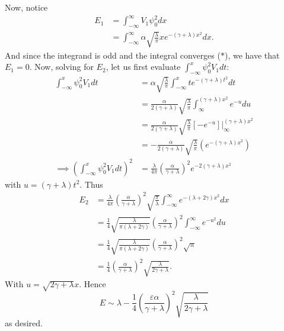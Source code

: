 \documentclass{article}
\begin{document}
\begin{itemize}
\begin{itemize}
        Now, notice 
        \begin{align*}
            E_1 &= \int_{-\infty}^{\infty}V_1\psi_0^2dx\\
            &= \int_{-\infty}^{\infty}\alpha \sqrt{\frac{\lambda}{\pi}}xe^{-(\gamma + \lambda)x^2}dx.
        \end{align*}
        And since the integrand is odd and the integral converges ($\ast$), we have that $E_1 = 0$. Now, solving for $E_2$, let us first evaluate ${\displaystyle \int_{-\infty}^{x}\psi_0^2V_1dt }$:
        \begin{align*}
            \int_{-\infty}^x\psi_0^2V_1dt &= \alpha\sqrt{\frac{\lambda}{\pi}}\int_{-\infty}^{x}te^{-(\gamma + \lambda)t^2}dt\\
            &= \frac{\alpha}{2(\gamma + \lambda)}\sqrt{\frac{\lambda}{\pi}}\int_{\infty}^{(\gamma + \lambda)x^2}e^{-u}du\\
            &= \frac{\alpha}{2(\gamma + \lambda)}\sqrt{\frac{\lambda}{\pi}}[-e^{-u}]\bigg|_{\infty}^{(\gamma + \lambda)x^2}\\
            &= -\frac{\alpha}{2(\gamma + \lambda)}\sqrt{\frac{\lambda}{\pi}}\left(e^{-(\gamma + \lambda)x^2}\right)\\
            \implies \left(\int_{-\infty}^{x}\psi_0^2V_1dt\right)^2 &= \frac{\lambda}{4\pi}\left(\frac{\alpha}{\gamma + \lambda}\right)^2e^{-2(\gamma + \lambda)x^2}
        \end{align*}
        with $u = (\gamma + \lambda)t^2$. Thus
        \begin{align*}
            E_2 &= \frac{\lambda}{4\pi}\left(\frac{\alpha}{\gamma + \lambda}\right)^2\sqrt{\frac{\pi}{\lambda}}\int_{-\infty}^{\infty}e^{-(\lambda + 2\gamma)x^2}dx\\
            &= \frac{1}{4}\sqrt{\frac{\lambda}{\pi(\lambda + 2\gamma)}}\left(\frac{\alpha}{\gamma + \lambda}\right)^2\int_{-\infty}^{\infty}e^{-u^2}du\\
            &= \frac{1}{4}\sqrt{\frac{\lambda}{\pi(\lambda + 2\gamma)}}\left(\frac{\alpha}{\gamma + \lambda}\right)^2\sqrt{\pi}\\
            &= \frac{1}{4}\left(\frac{\alpha}{\gamma + \lambda}\right)^2\sqrt{\frac{\lambda}{2\gamma + \lambda}}.
        \end{align*}
        With $u = \sqrt{2\gamma + \lambda}x$. Hence
        \[E \sim \lambda - \frac{1}{4}\left(\frac{\varepsilon \alpha}{\gamma + \lambda}\right)^2\sqrt{\frac{\lambda}{2\gamma + \lambda}}\]
        as desired.
        \newline\newline

\end{itemize}
\end{itemize}
\end{document}
